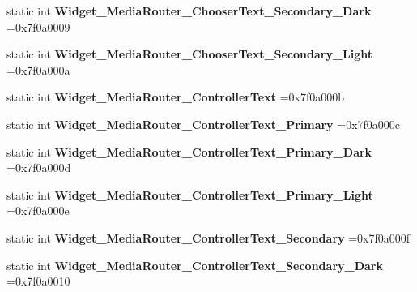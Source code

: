 \begin{DoxyCompactItemize}
static int {\bfseries Widget\+\_\+\+Media\+Router\+\_\+\+Chooser\+Text\+\_\+\+Secondary\+\_\+\+Dark} =0x7f0a0009
\item 
\mbox{\label{classandroid_1_1support_1_1design_1_1R_1_1style_a366fbd97c241b944957563534070f14e}} 
static int {\bfseries Widget\+\_\+\+Media\+Router\+\_\+\+Chooser\+Text\+\_\+\+Secondary\+\_\+\+Light} =0x7f0a000a
\item 
\mbox{\label{classandroid_1_1support_1_1design_1_1R_1_1style_a9165e0233696b17d5f39517420734d87}} 
static int {\bfseries Widget\+\_\+\+Media\+Router\+\_\+\+Controller\+Text} =0x7f0a000b
\item 
\mbox{\label{classandroid_1_1support_1_1design_1_1R_1_1style_acfa3fdf7e8d7dd74bf40528a5e8e3938}} 
static int {\bfseries Widget\+\_\+\+Media\+Router\+\_\+\+Controller\+Text\+\_\+\+Primary} =0x7f0a000c
\item 
\mbox{\label{classandroid_1_1support_1_1design_1_1R_1_1style_a0fbceeacbde2abd70c20648c6e3583e7}} 
static int {\bfseries Widget\+\_\+\+Media\+Router\+\_\+\+Controller\+Text\+\_\+\+Primary\+\_\+\+Dark} =0x7f0a000d
\item 
\mbox{\label{classandroid_1_1support_1_1design_1_1R_1_1style_ac7b8ff8223baaed78263bc4a84acd798}} 
static int {\bfseries Widget\+\_\+\+Media\+Router\+\_\+\+Controller\+Text\+\_\+\+Primary\+\_\+\+Light} =0x7f0a000e
\item 
\mbox{\label{classandroid_1_1support_1_1design_1_1R_1_1style_a35a20ed98afa551cc6ff21ad2089ad75}} 
static int {\bfseries Widget\+\_\+\+Media\+Router\+\_\+\+Controller\+Text\+\_\+\+Secondary} =0x7f0a000f
\item 
\mbox{\label{classandroid_1_1support_1_1design_1_1R_1_1style_aaa59d661dc064a2b972ca2b645c421c5}} 
static int {\bfseries Widget\+\_\+\+Media\+Router\+\_\+\+Controller\+Text\+\_\+\+Secondary\+\_\+\+Dark} =0x7f0a0010
\item 
\mbox{\label{classandroid_1_1support_1_1design_1_1R_1_1style_aa908f75c7f9bbfe0a7dca879567f0b44}} 

\end{DoxyCompactItemize}
